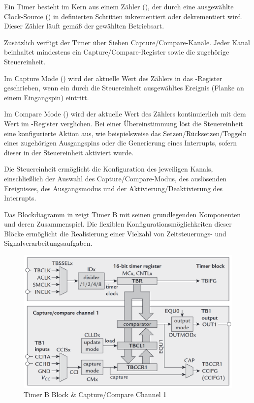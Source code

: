 Ein Timer besteht im Kern aus einem Z\"ahler (), der durch eine ausgew\"ahlte Clock-Source () in definierten Schritten inkrementiert oder dekrementiert wird. Dieser Z\"ahler l\"auft gem\"a{\ss} der gew\"ahlten Betriebsart.

Zus\"atzlich verf\"ugt der Timer \"uber Sieben Capture/Compare-Kan\"ale. Jeder Kanal beinhaltet mindestens ein Capture/Compare-Register sowie die zugeh\"orige Steuereinheit.

Im Capture Mode () wird der aktuelle Wert des Z\"ahlers in das -Register geschrieben, wenn ein durch die Steuereinheit ausgew\"ahltes Ereignis (\zB Flanke an einem Eingangspin) eintritt.

Im Compare Mode () wird der aktuelle Wert des Z\"ahlers kontinuierlich mit dem Wert im -Register verglichen. Bei einer \"Ubereinstimmung l\"ost die Steuereinheit eine konfigurierte Aktion aus, wie beispielsweise das Setzen/R\"ucksetzen/Toggeln eines zugeh\"origen Ausgangspins oder die Generierung eines Interrupts, sofern dieser in der Steuereinheit aktiviert wurde.

Die Steuereinheit erm\"oglicht die Konfiguration des jeweiligen Kanals, einschlie{\ss}lich der Auswahl des Capture/Compare-Modus, des ausl\"osenden Ereignisses, des Ausgangsmodus und der Aktivierung/Deaktivierung des Interrupts.

Das Blockdiagramm in  zeigt Timer B mit seinen grundlegenden Komponenten und deren Zusammenspiel. Die flexiblen Konfigurationsm\"oglichkeiten dieser Bl\"ocke erm\"oglicht die Realisierung einer Vielzahl von Zeitsteuerungs- und Signalverarbeitungsaufgaben.

\newpage
\vspace{1cm}
\begin{figure}[h!]
	\centering
	\includegraphics[width=1.0\textwidth]{../Bilder/BlockDiagram_TimerB.png}
	\caption{Timer B Block \& Capture/Compare Channel 1\\}
	\label{fig:BlockDiagramm_Timer}
\end{figure}

